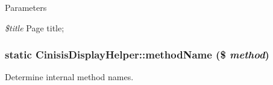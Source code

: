 \begin{DoxyParams}{Parameters}
\item[{\em \$title}]Page title; \end{DoxyParams}
\hypertarget{classCinisisDisplayHelper_ab263cf81e5c459c60baa6ef7fa5f76b2}{
\subsubsection[{methodName}]{\setlength{\rightskip}{0pt plus 5cm}static CinisisDisplayHelper::methodName (\$ {\em method})}}
\label{classCinisisDisplayHelper_ab263cf81e5c459c60baa6ef7fa5f76b2}
Determine internal method names.


